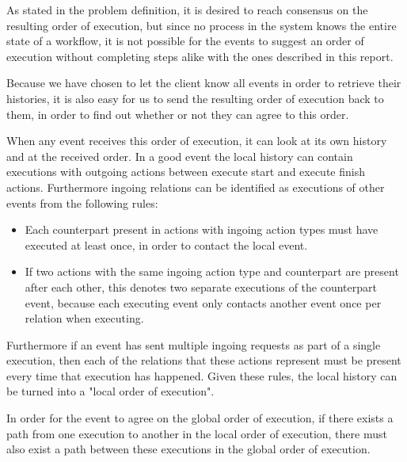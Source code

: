 	\newpar As stated in the problem definition, it is desired to reach consensus on the resulting order of execution, but since no process in the system knows the entire state of a workflow, it is not possible for the events to suggest an order of execution without completing steps alike with the ones described in this report.
	
	\newpar Because we have chosen to let the client know all events in order to retrieve their histories, it is also easy for us to send the resulting order of execution back to them, in order to find out whether or not they can agree to this order.
	
	\newpar When any event receives this order of execution, it can look at its own history and at the received order. In a good event the local history can contain executions with outgoing actions between execute start and execute finish actions. Furthermore ingoing relations can be identified as executions of other events from the following rules:
	
	\begin{itemize}
		\item Each counterpart present in actions with ingoing action types must have executed at least once, in order to contact the local event.
		\item If two actions with the same ingoing action type and counterpart are present after each other, this denotes two separate executions of the counterpart event, because each executing event only contacts another event once per relation when executing.
	\end{itemize}
	
	\newpar Furthermore if an event has sent multiple ingoing requests as part of a single execution, then each of the relations that these actions represent must be present every time that execution has happened. Given these rules, the local history can be turned into a "local order of execution".
	
	\newpar In order for the event to agree on the global order of execution, if there exists a path from one execution to another in the local order of execution, there must also exist a path between these executions in the global order of execution.
	
	\newpar {}